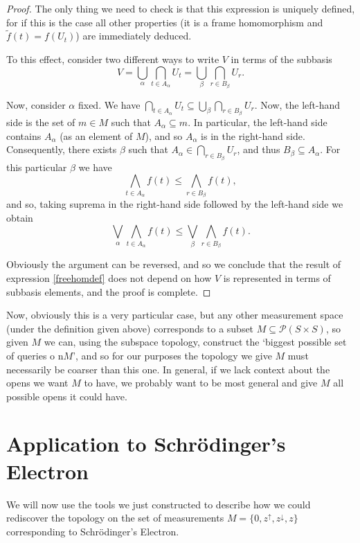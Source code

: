 \documentclass{article}
\theoremstyle{definition}
\theoremstyle{plain}
\newcommand{\ps}{\mathcal{P}}
\begin{document}
\begin{proof}
The only thing we need to check is that this expression is uniquely defined, for if this is the case all other properties (it is a frame homomorphism and $\tilde f(t) = f(U_t)$) are immediately deduced.

To this effect, consider two different ways to write $V$ in terms of the subbasis
\[V = \bigcup_\alpha \bigcap_{t \in A_\alpha} U_t = \bigcup_\beta \bigcap_{r \in B_\beta} U_r.\]

Now, consider $\alpha$ fixed. We have $\bigcap_{t \in A_\alpha} U_t \subseteq \bigcup_\beta \bigcap_{r \in B_\beta} U_r$. Now, the left-hand side is the set of $m \in M$ such that $A_\alpha \subseteq m$. In particular, the left-hand side contains $A_\alpha$ (as an element of $M$), and so $A_\alpha$ is in the right-hand side. Consequently, there exists $\beta$ such that $A_\alpha \in \bigcap_{r \in B_\beta} U_r$, and thus $B_\beta \subseteq A_\alpha$. For this particular $\beta$ we have
\[\bigwedge_{t \in A_\alpha} f(t) \leq \bigwedge_{r \in B_\beta} f(t),\]
and so, taking suprema in the right-hand side followed by the left-hand side we obtain
\[\bigvee_\alpha \bigwedge_{t \in A_\alpha} f(t) \leq \bigvee_\beta \bigwedge_{r \in B_\beta} f(t).\]

Obviously the argument can be reversed, and so we conclude that the result of expression \eqref{freehomdef} does not depend on how $V$ is represented in terms of subbasis elements, and the proof is complete.
\end{proof}

Now, obviously this is a very particular case, but any other measurement space (under the definition given above) corresponds to a subset $M \subseteq \ps(S \times S)$, so given $M$ we can, using the subspace topology, construct the `biggest possible set of queries o n$M$', and so for our purposes the topology we give $M$ must necessarily be coarser than this one. In general, if we lack context about the opens we want $M$ to have, we probably want to be most general and give $M$ all possible opens it could have.

\section{Application to Schrödinger's Electron}

We will now use the tools we just constructed to describe how we could rediscover the topology on the set of measurements $M = \{0,z^\uparrow,z^\downarrow,z\}$ corresponding to Schrödinger's Electron.
\end{document}
